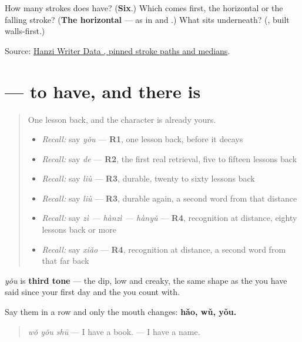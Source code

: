 \begin{tcolorbox}[breakable,colback=teal!4,colframe=teal!35!black,title={Before you move on}]
How many strokes does  have? (\textbf{Six}.) Which comes first, the horizontal or the falling stroke? (\textbf{The horizontal} — as in  and .) What sits underneath? (\textbf{}, built walls-first.)

Source: \href{https://raw.githubusercontent.com/chanind/hanzi-writer-data/68d10a4b21150cae5e1ebbd223eed289cf32d90c/data/\%E6\%9C\%89.json}{Hanzi Writer Data , pinned stroke paths and medians}.
\end{tcolorbox}
\section[\texorpdfstring{\zh{有} (yǒu)}{有 (yǒu)}]{ — to have, and there is}

\label{lesson:ZH-C24-you}



\begin{quote}
One lesson back, and the character is already yours.

\begin{itemize}
\raggedright
  \item \emph{Recall:} say \emph{yǒu} — \textbf{R1}, one lesson back, before it decays
  \item \emph{Recall:} say \emph{de} — \textbf{R2}, the first real retrieval, five to fifteen lessons back
  \item \emph{Recall:} say \emph{liù} — \textbf{R3}, durable, twenty to sixty lessons back
  \item \emph{Recall:} say \emph{liù} — \textbf{R3}, durable again, a second word from that distance
  \item \emph{Recall:} say \emph{zì — hànzì — hànyǔ} — \textbf{R4}, recognition at distance, eighty lessons back or more
  \item \emph{Recall:} say \emph{xiǎo} — \textbf{R4}, recognition at distance, a second word from that far back
\end{itemize}
\end{quote}

\begin{sounds}
\textbf{} \emph{yǒu} is \textbf{third tone} — the dip, low and creaky, the same shape as the  you have said since your first day and the  you count with.

Say them in a row and only the mouth changes: \textbf{hǎo, wǔ, yǒu.}

\begin{quote}
\textbf{} \emph{wǒ yǒu shū} — I have a book. \textbf{} — I have a name.
\end{quote}
\end{sounds}

